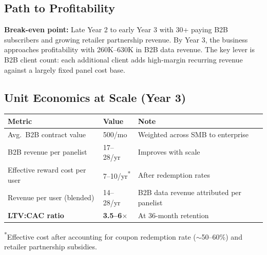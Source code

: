 \documentclass[11pt,a4paper]{article}
\begin{document}
\subsection{Path to Profitability}

\begin{alertbox}
\textbf{Break-even point:} Late Year 2 to early Year 3 with 30+ paying B2B subscribers and growing retailer partnership revenue. By Year 3, the business approaches profitability with \texteuro{}260K--630K in B2B data revenue. The key lever is B2B client count: each additional client adds high-margin recurring revenue against a largely fixed panel cost base.
\end{alertbox}

\subsection{Unit Economics at Scale (Year 3)}

\begin{center}
\renewcommand{\arraystretch}{1.4}
\begin{tabularx}{\textwidth}{L{5.5cm} R{3cm} L{5cm}}
\toprule
{}
\textbf{\color{white}Metric} & \textbf{\color{white}Value} & \textbf{\color{white}Note} \\
\midrule
Avg.\ B2B contract value & \texteuro{}500/mo & Weighted across SMB to enterprise \\
B2B revenue per panelist & \texteuro{}17--28/yr & Improves with scale \\
Effective reward cost per user & \texteuro{}7--10/yr\textsuperscript{*} & After redemption rates \\
Revenue per user (blended) & \texteuro{}14--28/yr & B2B data revenue attributed per panelist \\
\textbf{LTV:CAC ratio} & \textbf{3.5--6$\times$} & At 36-month retention \\
\bottomrule
\end{tabularx}
\end{center}

{\small\textsuperscript{*}Effective cost after accounting for coupon redemption rate ($\sim$50--60\%) and retailer partnership subsidies.}

\clearpage

\end{document}
